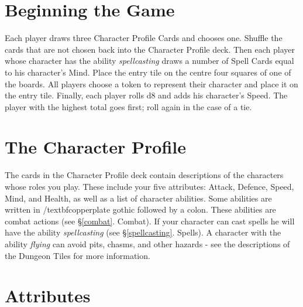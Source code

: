 \documentclass{book}
\begin{document}
\section{Beginning the Game}
Each player draws three Character Profile Cards and chooses one. Shuffle the cards that are not chosen back into the Character Profile deck. Then each player whose character has the ability \emph{spellcasting} draws a number of Spell Cards equal to his character’s Mind. Place the entry tile on the centre four squares of one of the boards. All players choose a token to represent their character and place it on the entry tile. Finally, each player rolls d8 and adds his character’s Speed. The player with the highest total goes first; roll again in the case of a tie.  

\section{The Character Profile}

The cards in the Character Profile deck contain descriptions of the characters whose roles you play. These include your five attributes: Attack, Defence, Speed, Mind, and Health, as well as a list of character abilities.
Some abilities are written in /textbf{copperplate gothic} followed by a colon. These abilities are combat actions (see §\ref{combat}. Combat). If your character can cast spells he will have the ability \emph{spellcasting} (see §\ref{spellcasting}.  Spells).
A character with the ability \emph{flying} can avoid pits, chasms, and other hazards - see the descriptions of the Dungeon Tiles for more information.

\section{Attributes}
\end{document}
